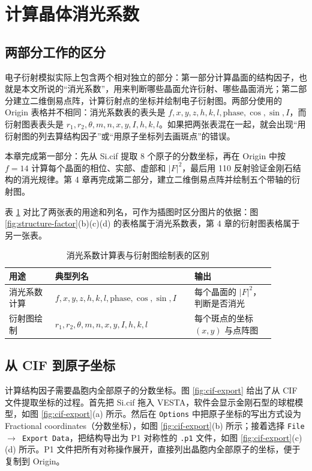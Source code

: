 \section{计算晶体消光系数}

\subsection{两部分工作的区分}

电子衍射模拟实际上包含两个相对独立的部分：第一部分计算晶面的结构因子，也就是本文所说的“消光系数”，用来判断哪些晶面允许衍射、哪些晶面消光；第二部分建立二维倒易点阵，计算衍射点的坐标并绘制电子衍射图。两部分使用的 Origin 表格并不相同：消光系数表的表头是 $f,x,y,z,h,k,l,\text{phase},\cos,\sin,I$，而衍射图表表头是 $r_1,r_2,\theta,m,n,x,y,I,h,k,l$。如果把两张表混在一起，就会出现“用衍射图的列去算结构因子”或“用原子坐标列去画斑点”的错误。

本章完成第一部分：先从 Si.cif 提取 8 个原子的分数坐标，再在 Origin 中按 $f=14$ 计算每个晶面的相位、实部、虚部和 $|F|^2$，最后用 110 反射验证金刚石结构的消光规律。第 4 章再完成第二部分，建立二维倒易点阵并绘制五个带轴的衍射图。

表 \ref{tab:two-tables} 对比了两张表的用途和列名，可作为插图时区分图片的依据：图 \ref{fig:structure-factor}(b)(c)(d) 的表格属于消光系数表，第 4 章的衍射图表格属于另一张表。

\begin{table}[H]
  \centering
  \caption{消光系数计算表与衍射图绘制表的区别}
  \label{tab:two-tables}
  \small
  \setlength{\tabcolsep}{4pt}
  \renewcommand{\arraystretch}{1.08}
  \begin{tabular}{p{0.16\linewidth}p{0.44\linewidth}p{0.28\linewidth}}
    \toprule
    用途 & 典型列名 & 输出 \\
    \midrule
    消光系数计算 & $f,x,y,z,h,k,l,\text{phase},\cos,\sin,I$ & 每个晶面的 $|F|^2$，判断是否消光 \\
    衍射图绘制 & $r_1,r_2,\theta,m,n,x,y,I,h,k,l$ & 每个斑点的坐标 $(x,y)$ 与点阵图 \\
    \bottomrule
  \end{tabular}
\end{table}

\subsection{从 CIF 到原子坐标}

计算结构因子需要晶胞内全部原子的分数坐标。图 \ref{fig:cif-export} 给出了从 CIF 文件提取坐标的过程。首先把 Si.cif 拖入 VESTA，软件会显示金刚石型的球棍模型，如图 \ref{fig:cif-export}(a) 所示。然后在 \texttt{Options} 中把原子坐标的写出方式设为 Fractional coordinates（分数坐标），如图 \ref{fig:cif-export}(b) 所示；接着选择 \texttt{File $\rightarrow$ Export Data}，把结构导出为 P1 对称性的 \texttt{.p1} 文件，如图 \ref{fig:cif-export}(c)(d) 所示。P1 文件把所有对称操作展开，直接列出晶胞内全部原子的坐标，便于复制到 Origin。

